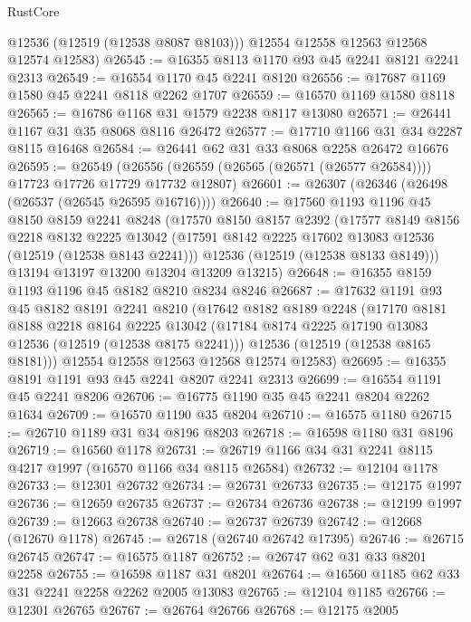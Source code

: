 \begin{lexlean}{RustCore}
\begin{coremodule}
        @12536
        (@12519 (@12538 @8087 @8103)))
      @12554
      @12558
      @12563
      @12568
      @12574
      @12583)
@26545 := @16355 @8113 @1170 @93 @45 @2241 @8121 @2241 @2313
@26549 := @16554 @1170 @45 @2241 @8120
@26556 := @17687 @1169 @1580 @45 @2241 @8118 @2262 @1707
@26559 := @16570 @1169 @1580 @8118
@26565 := @16786 @1168 @31 @1579 @2238 @8117 @13080
@26571 := @26441 @1167 @31 @35 @8068 @8116 @26472
@26577 := @17710 @1166 @31 @34 @2287 @8115 @16468
@26584 := @26441 @62 @31 @33 @8068 @2258 @26472 @16676
@26595 := @26549
    (@26556 (@26559 (@26565 (@26571 (@26577 @26584)))) @17723 @17726 @17729 @17732 @12807)
@26601 := @26307 (@26346 (@26498 (@26537 (@26545 @26595 @16716))))
@26640 := @17560
    @1193
    @1196
    @45
    @8150
    @8159
    @2241
    @8248
    (@17570
      @8150
      @8157
      @2392
      (@17577
        @8149
        @8156
        @2218
        @8132
        @2225
        @13042
        (@17591 @8142 @2225 @17602 @13083 @12536 (@12519 (@12538 @8143 @2241)))
        @12536
        (@12519 (@12538 @8133 @8149)))
      @13194
      @13197
      @13200
      @13204
      @13209
      @13215)
@26648 := @16355 @8159 @1193 @1196 @45 @8182 @8210 @8234 @8246
@26687 := @17632
    @1191
    @93
    @45
    @8182
    @8191
    @2241
    @8210
    (@17642
      @8182
      @8189
      @2248
      (@17170
        @8181
        @8188
        @2218
        @8164
        @2225
        @13042
        (@17184 @8174 @2225 @17190 @13083 @12536 (@12519 (@12538 @8175 @2241)))
        @12536
        (@12519 (@12538 @8165 @8181)))
      @12554
      @12558
      @12563
      @12568
      @12574
      @12583)
@26695 := @16355 @8191 @1191 @93 @45 @2241 @8207 @2241 @2313
@26699 := @16554 @1191 @45 @2241 @8206
@26706 := @16775 @1190 @35 @45 @2241 @8204 @2262 @1634
@26709 := @16570 @1190 @35 @8204
@26710 := @16575 @1180
@26715 := @26710 @1189 @31 @34 @8196 @8203
@26718 := @16598 @1180 @31 @8196
@26719 := @16560 @1178
@26731 := @26719 @1166 @34 @31 @2241 @8115 @4217 @1997 (@16570 @1166 @34 @8115 @26584)
@26732 := @12104 @1178
@26733 := @12301 @26732
@26734 := @26731 @26733
@26735 := @12175 @1997
@26736 := @12659 @26735
@26737 := @26734 @26736
@26738 := @12199 @1997
@26739 := @12663 @26738
@26740 := @26737 @26739
@26742 := @12668 (@12670 @1178)
@26745 := @26718 (@26740 @26742 @17395)
@26746 := @26715 @26745
@26747 := @16575 @1187
@26752 := @26747 @62 @31 @33 @8201 @2258
@26755 := @16598 @1187 @31 @8201
@26764 := @16560 @1185 @62 @33 @31 @2241 @2258 @2262 @2005 @13083
@26765 := @12104 @1185
@26766 := @12301 @26765
@26767 := @26764 @26766
@26768 := @12175 @2005

\end{coremodule}
\end{lexlean}
